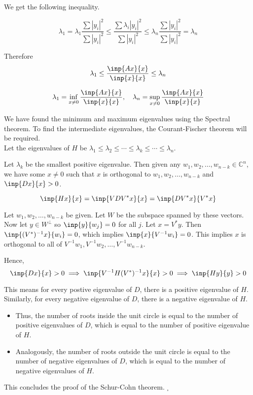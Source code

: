 \documentclass[twofold]{article}
\newcommand*\adj[1]{#1^*}
\newcommand*\abs[1]{\left \vert #1 \right\vert}
\theoremstyle{plain}
\theoremstyle{definition}
\theoremstyle{remark}
\begin{document}
We get the following inequality. 

\[\lambda_1 = \lambda_1 \frac{\sum \abs{y_i}^2}{\sum \abs{y_i}^2} \le \frac{\sum \lambda_i \abs{y_i}^2}{\sum \abs{y_i}^2} \le  \lambda_n \frac{\sum \abs{y_i}^2}{\sum \abs{y_i}^2} = \lambda_n\]

Therefore \[ \lambda_1 \le \frac{\inp{Ax}{x}}{\inp{x}{x}} \le \lambda_n\]

\[\lambda_1 = \inf _{x \ne 0} \frac{\inp{Ax}{x}}{\inp{x}{x}}, \quad \lambda_n = \sup_{x \ne 0} \frac{\inp{Ax}{x}}{\inp{x}{x}}\]

We have found the minimum and maximum eigenvalues using the Spectral theorem. To find the intermediate eigenvalues, the Courant-Fischer theorem will be required. \\

Let the eigenvalues of \(H\) be \(\lambda_1 \le \lambda_2 \le \cdots \le \lambda_k \le \cdots \le \lambda_n\).

Let \(\lambda_k\) be the smallest positive eigenvalue. Then given any \(w_1, w_2, \ldots , w_{n-k} \in \mathbb{C}^n\), we have some \(x \ne 0\) such that \(x\) is orthogonal to \( w_1, w_2 , \ldots , w_{n-k}\) and \(\inp{Dx}{x} > 0\).

\[\inp{Hx}{x} = \inp{VD\adj{V} x}{x} = \inp{D\adj{V} x}{\adj{V}x}\]

Let \(w_1, w_2, \ldots , w_{n-k}\) be given. Let \(W\) be the subspace spanned by these vectors. Now let \(y \in W^\perp\) so \(\inp{y}{w_j} = 0\) for all \(j\). Let \(x = \adj{V}y\).  Then \( \inp{(\adj{V})^{-1}x}{w_i} = 0\), which implies  \( \inp{x}{V^{-1} w_i} = 0\). This implies \(x\) is orthogonal to all of \(V^{-1}w_1,  V^{-1} w_2, \ldots , V^{-1} w_{n-k}\).

Hence,
\[\inp{Dx}{x} > 0 \implies \inp{V^{-1} H (\adj{V})^{-1} x}{x} > 0 \implies \inp{Hy}{y} > 0\]

This means for every postive eigenvalue of \(D\), there is a positive eigenvalue of \(H\). Similarly, for every negative eigenvalue of \(D\), there is a negative eigenvalue of \(H\). 

\begin{itemize}
\item Thus, the number of roots inside the unit circle is equal to the number of positive eigenvalues of \(D\), which is equal to the number of positive eigenvalue of \(H\).
 
\item Analogously, the number of roots outside the unit circle is equal to the number of negative eigenvalues of \(D\), which is equal to the number of negative eigenvalues of \(H\).
\end{itemize}
This concludes the proof of the Schur-Cohn theorem. \(_\square\)
\end{document}
